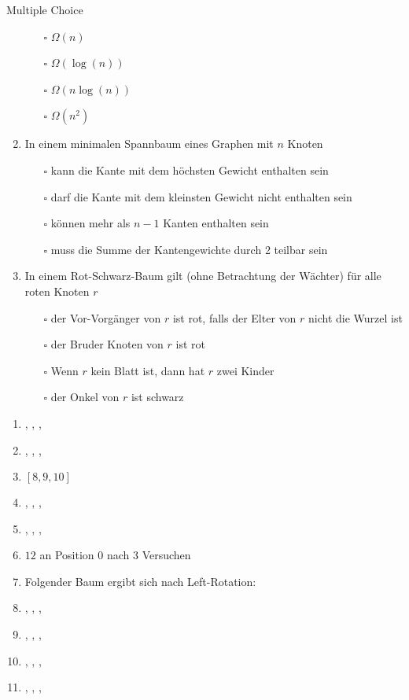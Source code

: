 \documentclass{article}
\begin{document}
\begin{exercise}{Multiple Choice}
\begin{enumerate}
          \begin{itemize}
            \item[$\square$] $\Omega(n)$
            \item[$\square$] $\Omega(\log(n))$
            \item[$\square$] $\Omega(n \log(n))$
            \item[$\square$] $\Omega(n^2)$
          \end{itemize}
    \item In einem minimalen Spannbaum eines Graphen mit $n$ Knoten
          \begin{itemize}
            \item[$\square$] kann die Kante mit dem höchsten Gewicht enthalten sein
            \item[$\square$] darf die Kante mit dem kleinsten Gewicht nicht enthalten sein
            \item[$\square$] können mehr als $n - 1$ Kanten enthalten sein
            \item[$\square$] muss die Summe der Kantengewichte durch 2 teilbar sein
          \end{itemize}
    \item In einem Rot-Schwarz-Baum gilt (ohne Betrachtung der Wächter) für alle roten Knoten $r$
          \begin{itemize}
            \item[$\square$] der Vor-Vorgänger von $r$ ist rot, falls der Elter von $r$ nicht die Wurzel ist
            \item[$\square$] der Bruder Knoten von $r$ ist rot
            \item[$\square$] Wenn $r$ kein Blatt ist, dann hat $r$ zwei Kinder
            \item[$\square$] der Onkel von $r$ ist schwarz
          \end{itemize}
  \end{enumerate}
  \begin{solution}
    \begin{enumerate}
      \item \xmark, \xmark, \xmark, \checkmark
      \item \xmark, \checkmark, \xmark, \xmark
      \item $[8, 9, 10]$
      \item \xmark, \xmark, \checkmark, \xmark
      \item \xmark, \xmark, \checkmark, \xmark
      \item $12$ an Position $0$ nach $3$ Versuchen
      \item Folgender Baum ergibt sich nach Left-Rotation: 
      \item \xmark, \xmark, \xmark, \checkmark
      \item \xmark, \xmark, \checkmark, \xmark
      \item \checkmark, \xmark, \xmark, \xmark
      \item \xmark, \xmark, \checkmark, \xmark
    \end{enumerate}
  \end{solution}
\end{exercise}
\end{document}
